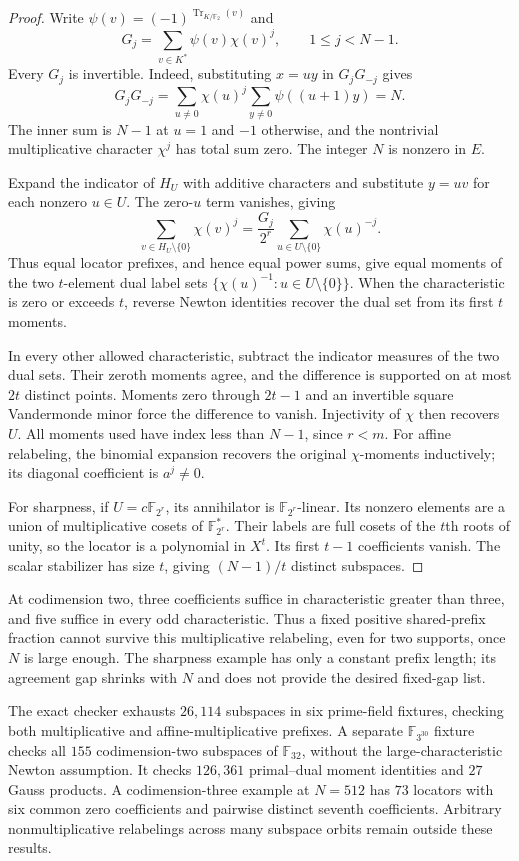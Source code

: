 \begin{proof}
Write $\psi(v)=(-1)^{\operatorname{Tr}_{K/\mathbb F_2}(v)}$ and
\[
 G_j=\sum_{v\in K^*}\psi(v)\chi(v)^j,\qquad 1\le j<N-1.
\]
Every $G_j$ is invertible. Indeed, substituting $x=uy$ in
$G_jG_{-j}$ gives
\[
 G_jG_{-j}=\sum_{u\ne0}\chi(u)^j
                  \sum_{y\ne0}\psi((u+1)y)=N.
\]
The inner sum is $N-1$ at $u=1$ and $-1$ otherwise, and the
nontrivial multiplicative character $\chi^j$ has total sum zero.
The integer $N$ is nonzero in $E$.

Expand the indicator of $H_U$ with additive characters and substitute
$y=uv$ for each nonzero $u\in U$. The zero-$u$ term vanishes, giving
\begin{equation}
 \sum_{v\in H_U\setminus\{0\}}\chi(v)^j
  =\frac{G_j}{2^r}
       \sum_{u\in U\setminus\{0\}}\chi(u)^{-j}.
 \label{eq:gauss-dual-moments}
\end{equation}
Thus equal locator prefixes, and hence equal power sums, give equal
moments of the two $t$-element dual label sets
$\{\chi(u)^{-1}:u\in U\setminus\{0\}\}$.
When the characteristic is zero or exceeds $t$, reverse Newton
identities recover the dual set from its first $t$ moments.

In every other allowed characteristic, subtract the indicator
measures of the two dual sets. Their zeroth moments agree, and the
difference is supported on at most $2t$ distinct points. Moments
zero through $2t-1$ and an invertible square Vandermonde minor force
the difference to vanish. Injectivity of $\chi$ then recovers $U$.
All moments used have index less than $N-1$, since $r<m$.
For affine relabeling, the binomial expansion recovers the original
$\chi$-moments inductively; its diagonal coefficient is $a^j\ne0$.

For sharpness, if $U=c\mathbb F_{2^r}$, its annihilator is
$\mathbb F_{2^r}$-linear. Its nonzero elements are a union of
multiplicative cosets of $\mathbb F_{2^r}^*$. Their labels are full
cosets of the $t$th roots of unity, so the locator is a polynomial
in $X^t$. Its first $t-1$ coefficients vanish. The scalar stabilizer
has size $t$, giving $(N-1)/t$ distinct subspaces.
\end{proof}

At codimension two, three coefficients suffice in characteristic
greater than three, and five suffice in every odd characteristic.
Thus a fixed positive shared-prefix fraction cannot survive this
multiplicative relabeling, even for two supports, once $N$ is large
enough. The sharpness example has only a constant prefix length;
its agreement gap shrinks with $N$ and does not provide the desired
fixed-gap list.

The exact checker exhausts $26{,}114$ subspaces in six prime-field
fixtures, checking both multiplicative and affine-multiplicative
prefixes. A separate $\mathbb F_{3^{30}}$ fixture checks all $155$
codimension-two subspaces of $\mathbb F_{32}$, without the
large-characteristic Newton assumption. It checks
$126{,}361$ primal--dual moment identities and $27$ Gauss products.
A codimension-three example at $N=512$ has $73$ locators with six
common zero coefficients and pairwise distinct seventh coefficients.
Arbitrary nonmultiplicative relabelings across many subspace orbits
remain outside these results.
